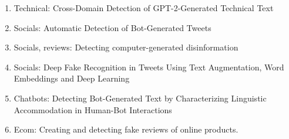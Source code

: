 \begin{enumerate}
    \item Technical: Cross-Domain Detection of GPT-2-Generated Technical Text
    \item Socials:  Automatic Detection of Bot-Generated Tweets
    \item Socials, reviews: Detecting computer-generated disinformation
    \item Socials: Deep Fake Recognition in Tweets Using Text Augmentation, Word Embeddings and Deep Learning
    \item Chatbots:  Detecting Bot-Generated Text by Characterizing Linguistic Accommodation in Human-Bot Interactions
    \item Ecom: Creating and detecting fake reviews of online products.
\end{enumerate}
